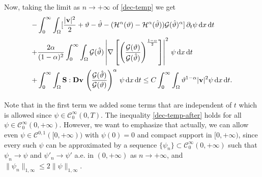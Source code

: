 \documentclass[11pt, a4paper, reqno]{amsart}
\numberwithin{equation}{section}
\newcommand{\dert}{\partial_t}
\newcommand{\thetah}{\hat\thet}
\newcommand{\vc}[1]{{\bf #1}}
\newcommand{\vv}{\vc{v}}
\newcommand{\thet}{\vartheta}
\renewcommand{\S}{\mathbf{S}}
\newcommand{\D}{\mathbf{D}}
\newcommand{\dt}{\,{\rm d} t }
\newcommand{\dx}{\,{\rm d} {x}}
\newcommand{\G}{\mathcal{G}}
\newcommand{\al}{\alpha}
\newcommand{\intnO}[1]{\int_0^{\infty}\intO{ #1 }\dt}
\newcommand{\intO}[1]{\int_{\Omega} #1 \dx}
\newcommand{\nm}[1]{\|#1\|}
\begin{document}
Now, taking the limit as $n\to+\infty$ of \eqref{dec-temp} we get 
\begin{equation}\label{dec-temp-after}
\begin{array}{l}\displaystyle\vspace{6pt}
 - \intnO{[\frac{|\vv|^2}{2}+\thet -\thetah - (\mathcal{H}^\al(\thet) - \mathcal{H}^\al(\thetah))\G(\thetah)^{\al}]\, \dert\psi}
\\ \displaystyle\vspace{6pt}
+ \frac{2\al}{(1-\al)^2}\intnO{ \G(\thetah) \left|\nabla\left[\left(\frac{\G(\thet)}{\G(\thetah)}\right)^{\frac{1-\al}{2}}\right]\right|^2 \,\psi} 
\\ \displaystyle\vspace{6pt}
+  \intnO{  \S:\D{\vv}\,  \left(\frac{\G(\thetah)}{\G(\thet)}\right)^{\al} \,\psi}\leq C\intnO{\thet^{1-\al}|\vv|^2\psi}.
\end{array}
\end{equation}
Note that in the first term we added some terms that are independent of $t$ which is allowed since $\psi\in \mathcal{C}^{\infty}_0(0,T)$. The inequality \eqref{dec-temp-after} holds for all $\psi\in \mathcal{C}^\infty_0(0,+\infty)$. However, we want to emphasize that actually, we can allow even $\psi\in \mathcal{C}^{0,1}([0,+\infty))$ with $\psi(0)=0$ and compact support in $[0,+\infty)$, since every such $\psi$ can be approximated by a sequence $\{\psi_n\}\subset \mathcal{C}^\infty_0(0,+\infty)$ such that $\psi_n\to\psi$ and $\psi'_n\to\psi'$ a.e. in $(0,+\infty)$ as $n\to+\infty$, and $\nm{\psi_n}_{1,\infty}\leq2\nm{\psi}_{1,\infty}$.
\end{document}
